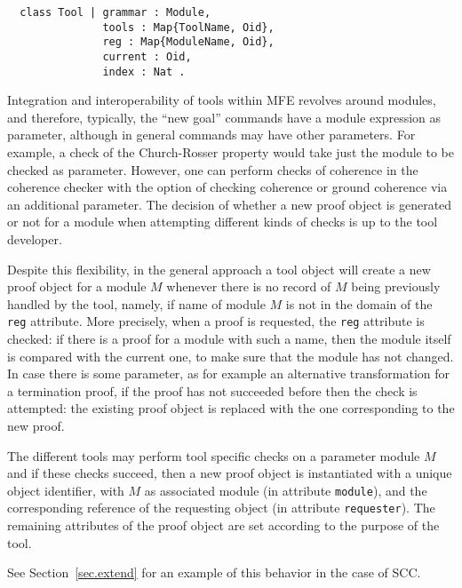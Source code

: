 \begin{small}
\begin{verbatim}
  class Tool | grammar : Module, 
               tools : Map{ToolName, Oid}, 
               reg : Map{ModuleName, Oid}, 
               current : Oid, 
               index : Nat .
\end{verbatim}
\end{small}
%
Integration and interoperability of tools within MFE revolves around modules, and therefore, typically, the ``new goal'' commands 
have a module expression as parameter, although in general commands
may have other parameters. For example, a check of the Church-Rosser property would take just the module to be checked as parameter.
However, one can perform checks of coherence in the coherence checker with the option of checking coherence or ground coherence via an additional parameter. 
The decision of whether a new proof object is generated or not for a module when attempting different kinds of checks is up to the tool developer. 

Despite this flexibility, in the general approach a tool object will create a new proof object for a module $M$ whenever there is no record of $M$ being previously handled by the tool, namely, if name of module $M$ is not in the domain of the {\tt reg} attribute. More precisely, when a proof is requested, the \texttt{reg} attribute is checked: if there is a proof for a module with such a name, then the module itself is compared with the current one, to make sure that the module has not changed. In case there is some parameter, as for example an alternative transformation for a termination proof, if the proof has not succeeded before then the check is attempted: the existing proof object is replaced with the one corresponding to the new proof. 

The different tools may perform tool specific checks on a parameter module $M$ and if these checks succeed, then a new proof 
object is instantiated with a unique object identifier, with $M$ as associated module (in attribute {\tt module}), and the corresponding
reference of the requesting object (in attribute \texttt{requester}). 
The remaining attributes of the proof
object are set according to the purpose
of the tool. 

See Section~\ref{sec.extend} for an example of this behavior in the case of SCC. %

